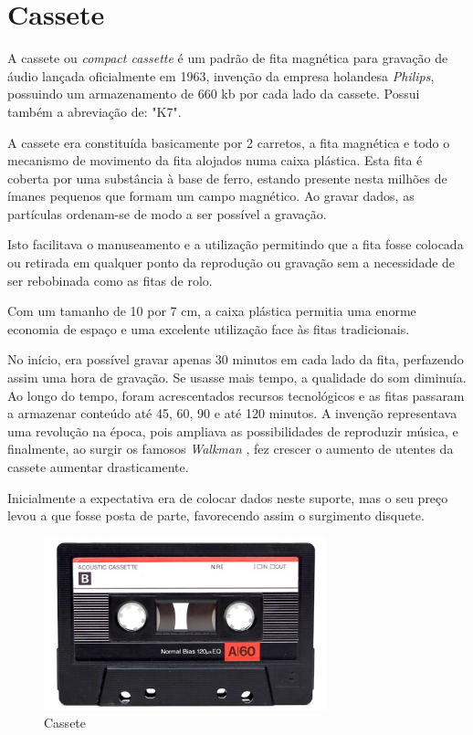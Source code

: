 \documentclass{report}
\begin{document}
		\section{Cassete}	
	A cassete ou \textit{compact cassette}  é um padrão de fita magnética para gravação de áudio lançada oficialmente em 1963, invenção da empresa holandesa \textit{Philips}, possuindo um armazenamento de 660 \ac{kb} por cada lado da cassete. Possui também a abreviação de: "K7".
\vspace{1mm}
	
	A cassete era constituída basicamente por 2 carretos, a fita magnética e todo o mecanismo de movimento da fita alojados numa caixa plástica. Esta fita é coberta por uma substância à base de ferro, estando presente nesta milhões de ímanes pequenos que formam um campo magnético. Ao gravar dados, as partículas ordenam-se de modo a ser possível a gravação.
\vspace{1mm}

	Isto facilitava o manuseamento e a utilização permitindo que a fita fosse colocada ou retirada em qualquer ponto da reprodução ou gravação sem a necessidade de ser rebobinada como as fitas de rolo. 
\vspace{1mm}
	
	Com um tamanho de 10 por 7 cm, a caixa plástica permitia uma enorme economia de espaço e uma excelente utilização face às fitas tradicionais.
\vspace{1mm}

	No início, era possível gravar apenas 30 minutos em cada lado da fita, perfazendo assim uma hora de gravação. Se usasse mais tempo, a qualidade do som diminuía. Ao longo do tempo, foram acrescentados recursos tecnológicos e as fitas passaram a armazenar conteúdo até 45, 60, 90 e até 120 minutos. A invenção representava uma revolução na época, pois ampliava as possibilidades de reproduzir música, e finalmente, ao surgir os famosos \textit{Walkman}  , fez crescer o aumento de utentes da cassete aumentar drasticamente.
\vspace{1mm}

	Inicialmente a expectativa era de colocar dados neste suporte, mas o seu preço levou a que fosse posta de parte, favorecendo assim o surgimento disquete.
	
	\begin{figure} [h]
		\centering
		\includegraphics[width=8.19cm, height=5cm]{cassete.jpg}
		\caption{Cassete}
	\end{figure}		
		
\end{document}
